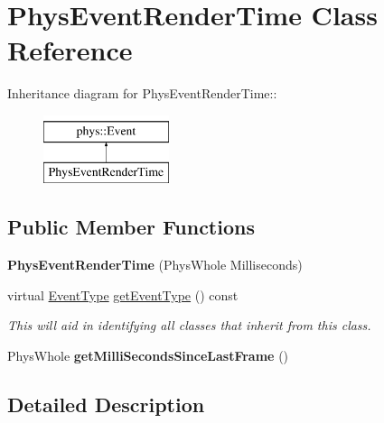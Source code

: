 \hypertarget{classPhysEventRenderTime}{
\section{PhysEventRenderTime Class Reference}
\label{d4/d83/classPhysEventRenderTime}
}
Inheritance diagram for PhysEventRenderTime::\begin{figure}[H]
\begin{center}
\leavevmode
\includegraphics[height=2cm]{d4/d83/classPhysEventRenderTime}
\end{center}
\end{figure}
\subsection*{Public Member Functions}
\begin{DoxyCompactItemize}
\item 
\hypertarget{classPhysEventRenderTime_af6ad859225b0c869af9145844ac5a248}{
{\bfseries PhysEventRenderTime} (PhysWhole Milliseconds)}
\label{d4/d83/classPhysEventRenderTime_af6ad859225b0c869af9145844ac5a248}

\item 
virtual \hyperlink{classphys_1_1Event_af5fdbb3e08d8e578d58770fbc606fda7}{EventType} \hyperlink{classPhysEventRenderTime_a96b0569f8b1cd459383318c9437130d4}{getEventType} () const 
\begin{DoxyCompactList}\small\item\em This will aid in identifying all classes that inherit from this class. \item\end{DoxyCompactList}\item 
\hypertarget{classPhysEventRenderTime_aaba6aa77d58877dc8b3784c1ebcfe7b6}{
PhysWhole {\bfseries getMilliSecondsSinceLastFrame} ()}
\label{d4/d83/classPhysEventRenderTime_aaba6aa77d58877dc8b3784c1ebcfe7b6}

\end{DoxyCompactItemize}


\subsection{Detailed Description}


